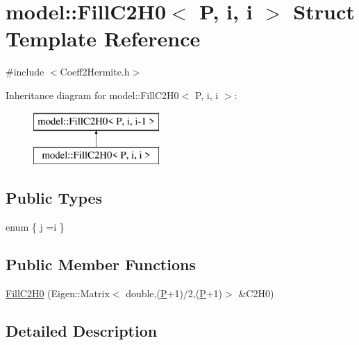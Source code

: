 \hypertarget{structmodel_1_1_fill_c2_h0_3_01_p_00_01i_00_01i_01_4}{}\section{model\+:\+:Fill\+C2\+H0$<$ P, i, i $>$ Struct Template Reference}
\label{structmodel_1_1_fill_c2_h0_3_01_p_00_01i_00_01i_01_4}


{\ttfamily \#include $<$Coeff2\+Hermite.\+h$>$}

Inheritance diagram for model\+:\+:Fill\+C2\+H0$<$ P, i, i $>$\+:\begin{figure}[H]
\begin{center}
\leavevmode
\includegraphics[height=2.000000cm]{structmodel_1_1_fill_c2_h0_3_01_p_00_01i_00_01i_01_4}
\end{center}
\end{figure}
\subsection*{Public Types}
\begin{DoxyCompactItemize}
\item 
enum \{ \hyperlink{structmodel_1_1_fill_c2_h0_3_01_p_00_01i_00_01i_01_4_aedab7860c338b6226812e5af71541599ad44b9c85ef11d9300443d2077712c186}{j} =i
 \}
\end{DoxyCompactItemize}
\subsection*{Public Member Functions}
\begin{DoxyCompactItemize}
\item 
\hyperlink{structmodel_1_1_fill_c2_h0_3_01_p_00_01i_00_01i_01_4_ad4d60c1b192d6f4c8c130f9db67be25f}{Fill\+C2\+H0} (Eigen\+::\+Matrix$<$ double,(\hyperlink{_f_e_m_2linear__elasticity__3d_2tetgen_2generate_p_o_l_ycube_8m_a50a9afb44201a65ab7ad5feb2150aeb6}{P}+1)/2,(\hyperlink{_f_e_m_2linear__elasticity__3d_2tetgen_2generate_p_o_l_ycube_8m_a50a9afb44201a65ab7ad5feb2150aeb6}{P}+1)$>$ \&C2\+H0)
\end{DoxyCompactItemize}


\subsection{Detailed Description}

